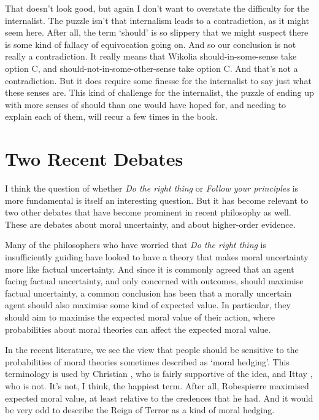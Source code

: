 That doesn't look good, but again I don't want to overstate the difficulty for the internalist. The puzzle isn't that internalism leads to a contradiction, as it might seem here. After all, the term `should' is so slippery that we might suspect there is some kind of fallacy of equivocation going on. And so our conclusion is not really a contradiction. It really means that \gls{Wikolia} should-in-some-sense take option C, and should-not-in-some-other-sense take option C. And that's not a contradiction. But it does require some finesse for the internalist to say just what these senses are. This kind of challenge for the internalist, the puzzle of ending up with more senses of should than one would have hoped for, and needing to explain each of them, will recur a few times in the book.

\section{Two Recent Debates}
\label{tworecentdebates}

I think the question of whether \emph{Do the right thing} or \emph{Follow your principles} is more fundamental is itself an interesting question. But it has become relevant to two other debates that have become prominent in recent philosophy as well. These are debates about moral uncertainty, and about higher-order evidence.

Many of the philosophers who have worried that \emph{Do the right thing} is insufficiently guiding have looked to have a theory that makes moral uncertainty more like factual uncertainty. And since it is commonly agreed that an agent facing factual uncertainty, and only concerned with outcomes, should maximise factual uncertainty, a common conclusion has been that a morally uncertain agent should also maximise some kind of expected value. In particular, they should aim to maximise the expected moral value of their action, where probabilities about moral theories can affect the expected moral value.

In the recent literature, we see the view that people should be sensitive to the probabilities of moral theories sometimes described as `moral hedging'. This terminology is used by Christian \citet{Tarsney2017}, who is fairly supportive of the idea, and Ittay \citet{NissanRozen2015}, who is not. It's not, I think, the happiest term. After all, \gls{Robespierre} maximised expected moral value, at least relative to the credences that he had. And it would be very odd to describe the Reign of Terror as a kind of moral hedging.

